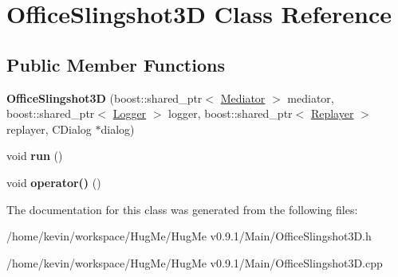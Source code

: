 \hypertarget{classOfficeSlingshot3D}{
\section{OfficeSlingshot3D Class Reference}
\label{classOfficeSlingshot3D}
}
\subsection*{Public Member Functions}
\begin{DoxyCompactItemize}
\item 
\hypertarget{classOfficeSlingshot3D_a7a320a41b54c317595dcfa33588c880d}{
{\bfseries OfficeSlingshot3D} (boost::shared\_\-ptr$<$ \hyperlink{classMediator}{Mediator} $>$ mediator, boost::shared\_\-ptr$<$ \hyperlink{classLogger}{Logger} $>$ logger, boost::shared\_\-ptr$<$ \hyperlink{classReplayer}{Replayer} $>$ replayer, CDialog $\ast$dialog)}
\label{classOfficeSlingshot3D_a7a320a41b54c317595dcfa33588c880d}

\item 
\hypertarget{classOfficeSlingshot3D_a0f34ade76b08ebb126176bca57eaec66}{
void {\bfseries run} ()}
\label{classOfficeSlingshot3D_a0f34ade76b08ebb126176bca57eaec66}

\item 
\hypertarget{classOfficeSlingshot3D_a525fe6fecb5ec28394dfe906596a5421}{
void {\bfseries operator()} ()}
\label{classOfficeSlingshot3D_a525fe6fecb5ec28394dfe906596a5421}

\end{DoxyCompactItemize}


The documentation for this class was generated from the following files:\begin{DoxyCompactItemize}
\item 
/home/kevin/workspace/HugMe/HugMe v0.9.1/Main/OfficeSlingshot3D.h\item 
/home/kevin/workspace/HugMe/HugMe v0.9.1/Main/OfficeSlingshot3D.cpp\end{DoxyCompactItemize}
